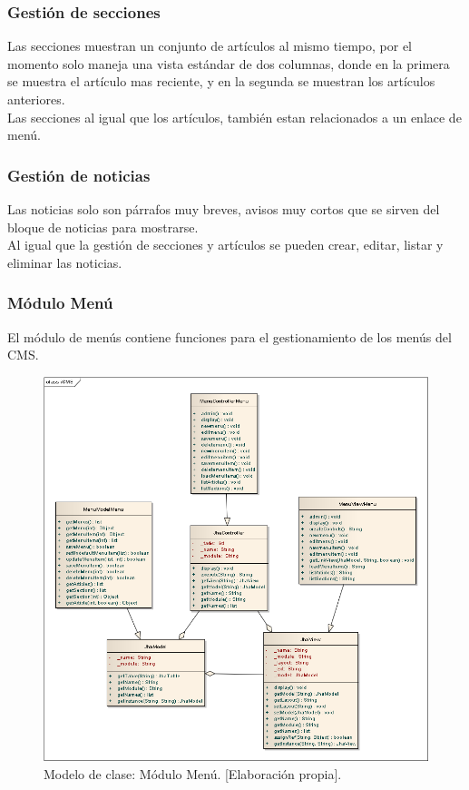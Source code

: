 \subsubsection{Gesti\'on de secciones}
Las secciones muestran un conjunto de art\'iculos al mismo tiempo, por el momento solo maneja una vista est\'andar de dos columnas, donde en la primera se muestra el art\'iculo mas reciente, y en la segunda se muestran los art\'iculos anteriores.\\
Las secciones al igual que los art\'iculos, tambi\'en estan relacionados a un enlace de men\'u.

\subsubsection{Gesti\'on de noticias}
Las noticias solo son p\'arrafos muy breves, avisos muy cortos que se sirven del bloque de noticias para mostrarse.\\
Al igual que la gesti\'on de secciones y art\'iculos se pueden crear, editar, listar y eliminar las noticias.

\newpage
\subsubsection{M\'odulo Men\'u}
El m\'odulo de men\'us contiene funciones para el gestionamiento de los men\'us del CMS.

\begin{figure}[h]
\centering
\includegraphics[scale=.4, keepaspectratio=true]{imagenes/15_imagen.png}
\caption{Modelo de clase: M\'odulo Men\'u. [Elaboraci\'on propia].}
\end{figure}

